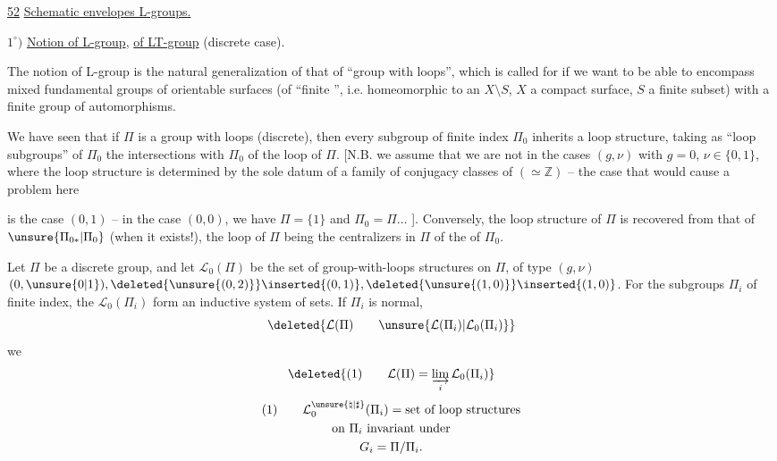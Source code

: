 
\uline{52}\qquad
\uline{Schematic envelopes  L-groups.}

$1^\circ)$ \uline{Notion of L-group}, \uline{of LT-group} (discrete case).

The notion of L-group is the natural
generalization of that of ``group with loops'',
which is called for if we want to be able to encompass
mixed fundamental groups of
orientable surfaces (of ``finite '', i.e.
homeomorphic to an $X\setminus S$, $X$ a compact surface,
$S$ a finite subset) with a finite group of automorphisms.

We have seen that if $\Pi$ is a
group with loops (discrete), then every subgroup
of finite index $\Pi_0$ inherits a
loop structure, taking as
``loop subgroups'' of $\Pi_0$ the intersections
with $\Pi_0$ of the loop  of $\Pi$. [N.B. we
assume that we are not in the cases
$(g,\nu)$  with $g=0$, $\nu\in\{0,1\}$, where the loop structure
is  determined by the sole datum of a
family of conjugacy classes of 
 $(\simeq\mathbb Z)$ -- the  case that would cause a problem here


is the case $(0,1)$  -- in the case $(0,0)$, we have $\Pi=\{1\}$
and $\Pi_0=\Pi\ldots$ ]. Conversely, the loop
structure of $\Pi$ is recovered from
that of $\unsure{\Pi_{0*}|\Pi_0}$ (when it exists!), the
loop  of $\Pi$ being the centralizers
in $\Pi$ of the  of $\Pi_0$.

Let $\Pi$ be a discrete group,
 and
let $\mathcal L_0(\Pi)$ be the set of group-with-loops
structures on $\Pi$, of type $(g,\nu)$
$(0,\unsure{0|1}),
\deleted{\unsure{(0,2)}}\inserted{(0,1)},
\deleted{\unsure{(1,0)}}\inserted{(1,0)}$.
For the subgroups  $\Pi_i$  of finite index,
the $\mathcal L_0(\Pi_i)$ form an inductive system
of sets.  If $\Pi_i$ is normal,
\[
\deleted{\mathcal L(\Pi)\qquad
\unsure{\mathcal L(\Pi_i)|\mathcal L_0(\Pi_i)}}
\]
we  
\[
\deleted{\text{(1)}\qquad
\mathcal L(\Pi)=\varinjlim_i\mathcal L_0(\Pi_i)}
\]
\[
\begin{gathered}
\text{(1)}\qquad
\mathcal L_0^{\unsure{\natural|\sharp}}(\Pi_i)=
\text{set of loop structures}\\
\text{on }\Pi_i\text{ invariant under}\\
G_i=\Pi/\Pi_i.
\end{gathered}
\]

